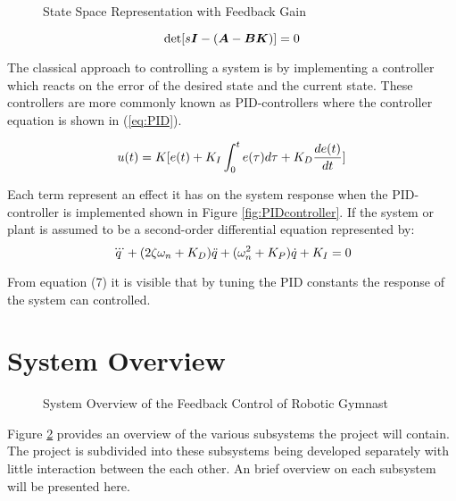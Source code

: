 \begin{figure}
	\centering
	
	\caption{State Space Representation with Feedback Gain}
	\label{fig:linearSys}
\end{figure}

\begin{equation} \label{eq:closedSysFeedback}
\centering
\text{det}[s\boldsymbol{I}-(\boldsymbol{A}-\boldsymbol{B}\boldsymbol{K})] = 0
\end{equation}

The classical approach to controlling a system is by implementing a controller which reacts on the error of the desired state and the current state. These controllers are more commonly known as PID-controllers where the controller equation is shown in (\ref{eq:PID}).

\begin{equation} \label{eq:PID}
\centering
u(t) = K[ e(t)+K_{I}\int_{0}^{t}e(\tau)d\tau +K_{D}\frac{de(t)}{dt}]
\end{equation}

Each term represent an effect it has on the system response when the PID-controller is implemented shown in Figure \ref{fig:PIDcontroller}. If the system or plant is assumed to be a second-order differential equation represented by:
\begin{equation} \label{eq:PID_system}
\centering
\dddot{q}+(2\zeta\omega_{n}+K_{D})\ddot{q}+(\omega_{n}^2+K_{P})\dot{q}+K_{I} = 0
\end{equation}

From equation (7) it is visible that by tuning the PID constants the response of the system can controlled.

\section{System Overview}
\begin{figure}[h]
	\centering
	
	\caption{System Overview of the Feedback Control of Robotic Gymnast}
	\label{fig:system_overview}
\end{figure}


Figure \ref{fig:system_overview} provides an overview of the various subsystems the project will contain. The project is subdivided into these subsystems being developed separately with little interaction between the each other. An brief overview on each subsystem will be presented here.\\

